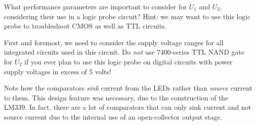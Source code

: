 

What performance parameters are important to consider for $U_1$ and $U_2$, considering their use in a logic probe circuit?  Hint: we may want to use this logic probe to troubleshoot CMOS as well as TTL circuits.







First and foremost, we need to consider the supply voltage ranges for all integrated circuits used in this circuit.  Do {\it not} use 7400-series TTL NAND gate for $U_2$ if you ever plan to use this logic probe on digital circuits with power supply voltages in excess of 5 volts!







Note how the comparators {\it sink} current from the LEDs rather than {\it source} current to them.  This design feature was necessary, due to the construction of the LM339.  In fact, there are a lot of comparators that can only sink current and not source current due to the internal use of an open-collector output stage.



